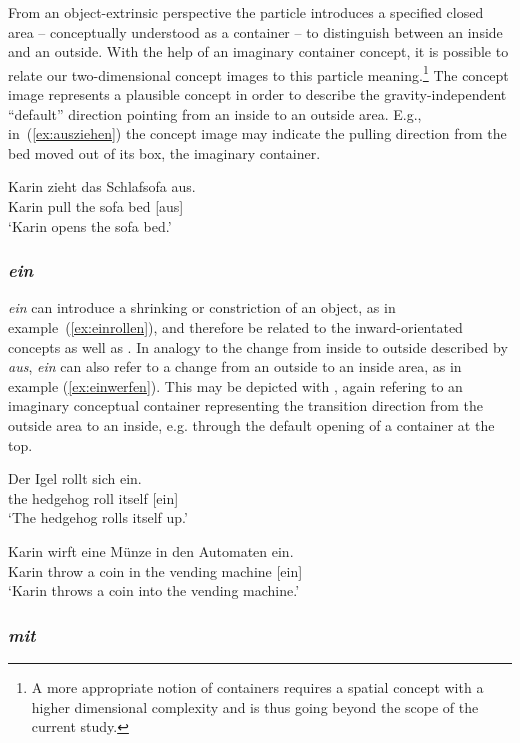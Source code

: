 \documentclass[output=paper]{langsci/langscibook}
\begin{document}
From an object-extrinsic perspective the particle introduces a
specified closed area -- conceptually understood as a container -- to
distinguish between an inside and an outside. With the help of an
imaginary container concept, it is possible to relate our
two-dimensional concept images to this particle meaning.\footnote{A more
  appropriate notion of containers requires a spatial concept with a
  higher dimensional complexity and is thus going beyond the scope of
  the current study.} The concept image  represents a
plausible concept in order to describe the gravity-independent
``default'' direction pointing from an inside to an outside area.
E.g., in~(\ref{ex:ausziehen}) the concept image  may
indicate the pulling direction from the bed moved out of its box, the
imaginary container.

\ea\label{ex:ausziehen}
\gll Karin zieht das Schlafsofa aus.\\
Karin pull the {sofa bed} [aus]\\
\glt `Karin opens the sofa bed.'
\z


\subsubsection{\textit{ein}}

\textit{ein} can introduce a shrinking or constriction of an object,
as in example~(\ref{ex:einrollen}), and therefore be related to the
inward-orientated concepts  as well as
. In analogy to the change from inside to outside
described by \textit{aus}, \textit{ein} can also refer to a change
from an outside to an inside area, as in example
(\ref{ex:einwerfen}). This may be depicted with ,
again refering to an imaginary conceptual container representing the
transition direction from the outside area to an inside, e.g.  through
the default opening of a container at the top.

\ea\label{ex:einrollen}
\gll Der Igel rollt sich ein.\\
the hedgehog roll itself [ein]\\
\glt `The hedgehog rolls itself up.'
\z

\ea\label{ex:einwerfen}
\gll Karin wirft eine Münze in den Automaten ein.\\
Karin throw a coin in the {vending machine} [ein]\\
\glt `Karin throws a coin into the vending machine.'
\z


\subsubsection{\textit{mit}}
\end{document}
